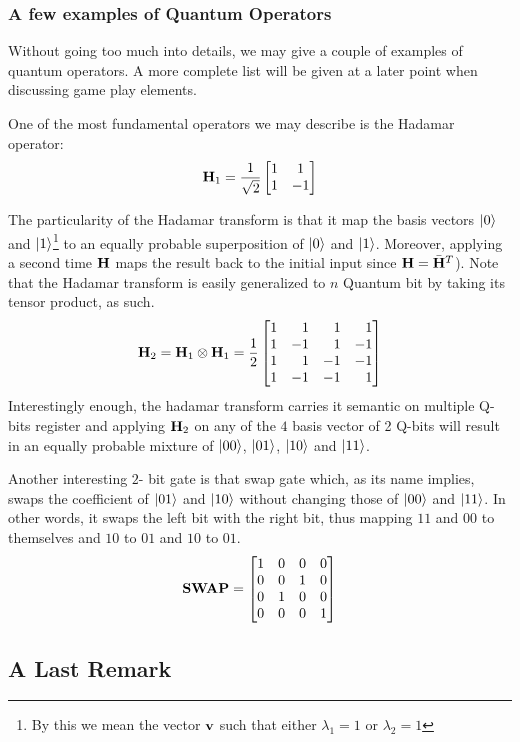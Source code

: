 \documentclass[a4paper]{article}
\begin{document}
\subsubsection{A few examples of Quantum Operators}

Without going too much into details, we may give a couple of examples of quantum operators. A more complete list will be given at a later point when discussing game play elements.

One of the most fundamental operators we may describe is the Hadamar operator:
\[
\mathbf{H}_1 = \frac{1}{\sqrt{2}}
\begin{bmatrix}
1 & 1 \\
1 & -1
\end{bmatrix}
\]

The particularity of the Hadamar transform is that it map the basis vectors $\left| 0 \right>$ and $\left| 1 \right>$\footnote{By this we mean the vector $\mathbf{v}$ such that either $\lambda_1 = 1$ or $\lambda_2 = 1$} to an equally probable superposition of $\left| 0 \right>$ and $\left| 1 \right>$. Moreover, applying a second time $\mathbf{H}$ maps the result back to the initial input since $\mathbf{H} = \bar{\mathbf{H}}^T$). Note that the Hadamar transform is easily generalized to $n$ Quantum bit by taking its tensor product, as such.
\[
\H_2 = \H_1 \otimes \H_1 = \frac{1}{2}
\begin{bmatrix*}[r]
 1 &  1 &  1 &  1 \\
 1 & -1 &  1 & -1 \\
 1 &  1 & -1 & -1 \\
 1 & -1 & -1 &  1
\end{bmatrix*}
\]
Interestingly enough, the hadamar transform carries it semantic on multiple Q-bits register and applying $\mathbf{H}_2$ on any of the $4$ basis vector of 2 Q-bits will result in an equally probable mixture of $\left| 00 \right>$, $\left| 01 \right>$, $\left| 10 \right>$ and $\left| 11 \right>$.

Another interesting $2$- bit gate is that swap gate which, as its name implies, swaps the coefficient of $\left| 01 \right>$ and $\left| 10 \right>$ without changing those of $\left| 00 \right>$ and $\left| 11 \right>$. In other words, it swaps the left bit with the right bit, thus mapping $11$ and $00$ to themselves and $10$ to $01$ and $10$ to $01$.
\[
\mathbf{SWAP} = 
\begin{bmatrix}
 1 &  0 &  0 &  0 \\
 0 &  0 &  1 &  0 \\
 0 &  1 &  0 &  0 \\
 0 &  0 &  0 &  1
\end{bmatrix}
\]

\subsection{A Last Remark}
\end{document}
